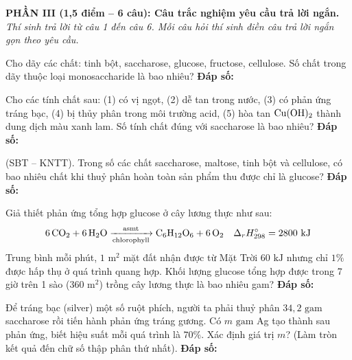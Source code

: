 \documentclass[12pt,a4paper]{article}
\begin{document}
\vspace{0.15cm}
\noindent
\textbf{PHẦN III (1,5 điểm -- 6 câu): Câu trắc nghiệm yêu cầu trả lời ngắn.}\\
\textit{Thí sinh trả lời từ câu 1 đến câu 6. Mỗi câu hỏi thí sinh điền câu trả lời ngắn gọn theo yêu cầu.}

\setcounter{ex}{0}

\begin{ex}
Cho dãy các chất: tinh bột, saccharose, glucose, fructose, cellulose. Số chất trong dãy thuộc loại monosaccharide là bao nhiêu?
\loigiai{}
\noindent\textbf{Đáp số:} \dotfill
\end{ex}

\begin{ex}
Cho các tính chất sau: (1) có vị ngọt, (2) dễ tan trong nước, (3) có phản ứng tráng bạc, (4) bị thủy phân trong môi trường acid, (5) hòa tan $\ce{Cu(OH)2}$ thành dung dịch màu xanh lam. Số tính chất đúng với saccharose là bao nhiêu?
\loigiai{}
\noindent\textbf{Đáp số:} \dotfill
\end{ex}

\begin{ex}
(SBT -- KNTT). Trong số các chất saccharose, maltose, tinh bột và cellulose, có bao nhiêu chất khi thuỷ phân hoàn toàn sản phẩm thu được chỉ là glucose?
\loigiai{}
\noindent\textbf{Đáp số:} \dotfill
\end{ex}

\begin{ex}
Giả thiết phản ứng tổng hợp glucose ở cây lương thực như sau:
\[
\ce{6CO2 + 6H2O} \xrightarrow[\text{chlorophyll}]{\text{asmt}} \ce{C6H12O6 + 6O2} \quad \Delta_r H^\circ_{298} = 2800\text{ kJ}
\]
Trung bình mỗi phút, $1\text{ m}^2$ mặt đất nhận được từ Mặt Trời $60\text{ kJ}$ nhưng chỉ $1\%$ được hấp thụ ở quá trình quang hợp. Khối lượng glucose tổng hợp được trong 7 giờ trên 1 sào ($360\text{ m}^2$) trồng cây lương thực là bao nhiêu gam?
\loigiai{}
\noindent\textbf{Đáp số:} \dotfill
\end{ex}

\begin{ex}
Để tráng bạc (silver) một số ruột phích, người ta phải thuỷ phân $34{,}2\text{ gam}$ saccharose rồi tiến hành phản ứng tráng gương. Có $m\text{ gam}$ Ag tạo thành sau phản ứng, biết hiệu suất mỗi quá trình là $70\%$. Xác định giá trị $m$? (Làm tròn kết quả đến chữ số thập phân thứ nhất).
\loigiai{}
\noindent\textbf{Đáp số:} \dotfill
\end{ex}
\end{document}
